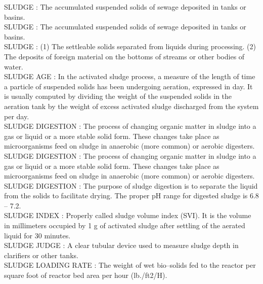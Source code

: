 \vspace{0.15cm}
SLUDGE :   The accumulated suspended solids of sewage deposited in tanks or basins.\\
\vspace{0.15cm}
SLUDGE :   The accumulated suspended solids of sewage deposited in tanks or basins.\\
\vspace{0.15cm}
SLUDGE :  (1)     The settleable solids separated from liquids during processing.  (2)     The deposits of foreign material on the bottoms of streams or other bodies of water.\\
\vspace{0.15cm}
SLUDGE AGE :   In the activated sludge process, a measure of the length of time a particle of suspended solids has been undergoing aeration, expressed in day. It is usually computed by dividing the weight of the suspended solids in the aeration tank by the weight of excess activated sludge discharged from the system per day.\\
\vspace{0.15cm}
SLUDGE DIGESTION :  The process of changing organic matter in sludge into a gas or liquid or a more stable solid form. These changes take place as microorganisms feed on sludge in anaerobic (more common) or aerobic digesters.\\
\vspace{0.15cm}
SLUDGE DIGESTION :  The process of changing organic matter in sludge into a gas or liquid or a more stable solid form. These changes take place as microorganisms feed on sludge in anaerobic (more common) or aerobic digesters.\\
\vspace{0.15cm}
SLUDGE DIGESTION :  The purpose of sludge digestion is to separate the liquid from the solids to facilitate drying. The proper pH range for digested sludge is 6.8 – 7.2.\\
\vspace{0.15cm}
SLUDGE INDEX :   Properly called sludge volume index (SVI). It is the volume in millimeters occupied by 1 g of activated sludge after settling of the aerated liquid for 30 minutes.\\
\vspace{0.15cm}
SLUDGE JUDGE :  A clear tubular device used to measure sludge depth in clarifiers or other tanks.\\
\vspace{0.15cm}
SLUDGE LOADING RATE :  The weight of wet bio–solids fed to the reactor per square foot of reactor bed area per hour (lb./ft2/H). \\
